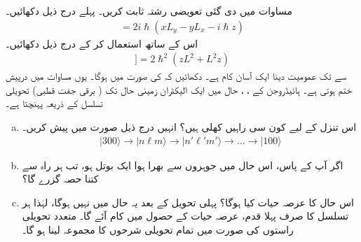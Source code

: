 مساوات  میں دی گئی تعویضی  رشتہ ثابت کریں۔  پہلے درج ذیل دکھائیں۔
\begin{align*}
	[L^2, z] = 2i\hslash(xL_y-yL_x-i\hslash z)
\end{align*}
اس کے ساتھ  استعمال کر کے درج ذیل دکھائیں۔
\begin{align*}
[L^2, [L^2, z]] = 2\hslash^2(zL^2+L^2z)	
\end{align*}
 سے  تک عمومیت دینا ایک آسان کام ہے۔
دکھائیں کہ  کی صورت میں  ہوگا۔ یوں مساوات  میں درپیش  ختم ہوتی ہے۔
ہائیڈروجن کے ، ،  حال میں ایک الیکٹران زمینی حال تک ( برقی جفت قطبی) تحویلی تسلسل کے ذریعہ پہنچتا ہے۔
\begin{enumerate}[a.]
\item
 اس تنزل کے لیے کون سی راہیں کھلی ہیں؟ انہیں درج ذیل صورت میں پیش کریں۔
\begin{align*}
	|300\rangle\to | n\ell m\rangle\to | n'\ell'm'\rangle\to\dots\to|100\rangle
\end{align*}
\item
 اگر آپ کے پاس، اس حال میں جوہروں سے بھرا ہوا ایک بوتل ہو، تب ہر راہ سے کتنا حصہ گزرے گا؟
\item
 اس حال کا عرصہ حیات کیا ہوگا؟  پہلی تحویل کے بعد یہ حال  میں نہیں ہوگا، لہٰذا ہر تسلسل کا صرف پہلا قدم، عرصہ حیات کے حصول میں کام آئے گا۔ متعدد تحویلی راستوں کی صورت میں تمام تحویلی شرحوں کا مجموعہ لینا ہو گا۔
 \end{enumerate}

